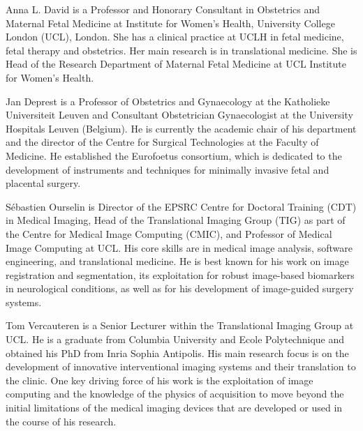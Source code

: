 \documentclass[10pt,journal,compsoc]{IEEEtran}
\begin{document}
\begin{IEEEbiography}{Anna L. David} is a Professor and Honorary Consultant in Obstetrics and Maternal Fetal Medicine at Institute for Women's Health, University College London (UCL), London. She has a clinical practice at UCLH in fetal medicine, fetal therapy and obstetrics. Her main research is in translational medicine. She is Head of the Research Department of Maternal Fetal Medicine at UCL Institute for Women's Health. 
\end{IEEEbiography}


\begin{IEEEbiography}{Jan Deprest} is a Professor of Obstetrics and Gynaecology at the Katholieke Universiteit Leuven and Consultant Obstetrician Gynaecologist at the University Hospitals Leuven (Belgium). He is currently the academic chair of his department and the director of the Centre for Surgical Technologies at the Faculty of Medicine. He established the Eurofoetus consortium, which is dedicated to the development of instruments and techniques for minimally invasive fetal and placental surgery. 
\end{IEEEbiography}




\begin{IEEEbiography}{S\'ebastien Ourselin}
	is %
	Director of the EPSRC Centre for Doctoral Training (CDT) in Medical Imaging, Head of the Translational Imaging Group (TIG) as part of the Centre for Medical Image Computing (CMIC), and Professor of Medical Image Computing at UCL. His core skills are in medical image analysis, software engineering, and translational medicine. He is best known for his work on image registration and segmentation, its exploitation for robust image-based biomarkers in neurological conditions, as well as for his development of image-guided surgery systems. %
\end{IEEEbiography}


\begin{IEEEbiography}{Tom Vercauteren}
is a Senior Lecturer within the Translational Imaging Group at UCL. %
He is a graduate from Columbia University and Ecole Polytechnique and obtained his PhD from Inria Sophia Antipolis. His main research focus is on the development of innovative interventional imaging systems and their translation to the clinic. One key driving force of his work is the exploitation of image computing and the knowledge of the physics of acquisition to move beyond the initial limitations of the medical imaging devices that are developed or used in the course of his research. 
\end{IEEEbiography}
\end{document}
